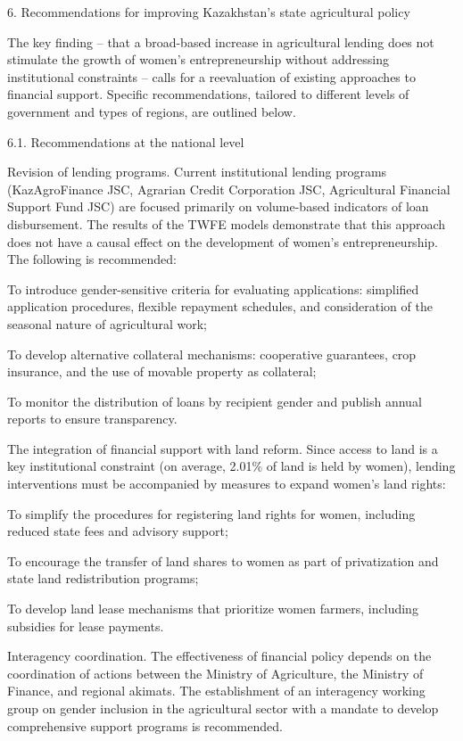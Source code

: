 \documentclass[
]{article}
\begin{document}
6. Recommendations for improving Kazakhstan's state agricultural policy

The key finding -- that a broad-based increase in agricultural lending
does not stimulate the growth of women's entrepreneurship without
addressing institutional constraints -- calls for a reevaluation of
existing approaches to financial support. Specific recommendations,
tailored to different levels of government and types of regions, are
outlined below.

6.1. Recommendations at the national level

Revision of lending programs. Current institutional lending programs
(KazAgroFinance JSC, Agrarian Credit Corporation JSC, Agricultural
Financial Support Fund JSC) are focused primarily on volume-based
indicators of loan disbursement. The results of the TWFE models
demonstrate that this approach does not have a causal effect on the
development of women's entrepreneurship. The following is recommended:

To introduce gender-sensitive criteria for evaluating applications:
simplified application procedures, flexible repayment schedules, and
consideration of the seasonal nature of agricultural work;

To develop alternative collateral mechanisms: cooperative guarantees,
crop insurance, and the use of movable property as collateral;

To monitor the distribution of loans by recipient gender and publish
annual reports to ensure transparency.

The integration of financial support with land reform. Since access to
land is a key institutional constraint (on average, 2.01\% of land is
held by women), lending interventions must be accompanied by measures to
expand women's land rights:

To simplify the procedures for registering land rights for women,
including reduced state fees and advisory support;

To encourage the transfer of land shares to women as part of
privatization and state land redistribution programs;

To develop land lease mechanisms that prioritize women farmers,
including subsidies for lease payments.

Interagency coordination. The effectiveness of financial policy depends
on the coordination of actions between the Ministry of Agriculture, the
Ministry of Finance, and regional akimats. The establishment of an
interagency working group on gender inclusion in the agricultural sector
with a mandate to develop comprehensive support programs is recommended.
\end{document}
